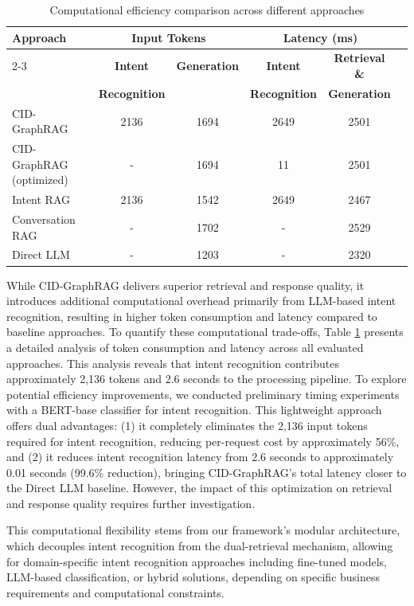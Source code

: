 \documentclass[
]{style/ceurart}
\begin{document}
\begin{table}[ht]
\centering
\caption{Computational efficiency comparison across different approaches}
\label{tab:performance_efficiency}
\begin{tabular}{lccccc}
\hline
\textbf{Approach} & \multicolumn{2}{c}{\textbf{Input Tokens}} & \multicolumn{2}{c}{\textbf{Latency (ms)}} \\
\cline{2-3} \cline{4-6}
 & \textbf{Intent} & \textbf{Generation} & \textbf{Intent} & \textbf{Retrieval \&} \\
 & \textbf{Recognition} &  & \textbf{Recognition} & \textbf{Generation} & \\
\hline
CID-GraphRAG & 2136 & 1694 & 2649 & 2501 \\
CID-GraphRAG (optimized) & - & 1694 & 11 & 2501 \\
Intent RAG & 2136 & 1542 & 2649 & 2467 \\
Conversation RAG & - & 1702 & - & 2529 \\
Direct LLM & - & 1203 & - & 2320 \\
\hline
\end{tabular}
\end{table}

While CID-GraphRAG delivers superior retrieval and response quality, it introduces additional computational overhead primarily from LLM-based intent recognition, resulting in higher token consumption and latency compared to baseline approaches. To quantify these computational trade-offs, Table \ref{tab:performance_efficiency} presents a detailed analysis of token consumption and latency across all evaluated approaches. This analysis reveals that intent recognition contributes approximately 
2,136 tokens and 2.6 seconds to the processing pipeline. To explore potential efficiency improvements, we conducted preliminary timing experiments with a BERT-base classifier for intent recognition. This lightweight approach offers 
dual advantages: (1) it completely eliminates the 2,136 input tokens required for intent recognition, reducing per-request cost by approximately 56\%, and (2) it reduces intent recognition latency from 
2.6 seconds to approximately 0.01 seconds (99.6\% reduction), bringing CID-GraphRAG's total latency closer to the Direct LLM baseline. However, the impact of this optimization on retrieval and response quality requires further investigation.

This computational flexibility stems from our framework's modular architecture, which decouples intent recognition from the dual-retrieval mechanism, allowing for domain-specific intent recognition approaches including fine-tuned models, LLM-based classification, or hybrid solutions, depending on specific business requirements and computational constraints.
\end{document}
